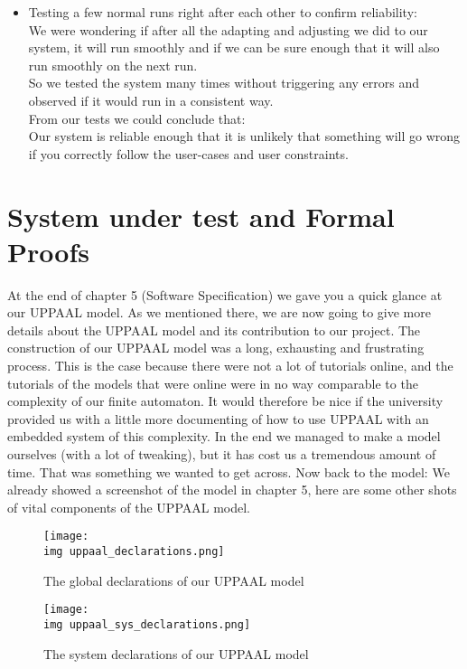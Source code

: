 \begin{itemize}
\item Testing a few normal runs right after each other to confirm reliability:\\
We were wondering if after all the adapting and adjusting we did to our system, it will run smoothly and if we can be sure enough that it will also run smoothly on the next run.\\
So we tested the system many times without triggering any errors and observed if it would run in a consistent way.\\
From our tests we could conclude that:\\
Our system is reliable enough that it is unlikely that something will go wrong if you correctly follow the user-cases and user constraints.\\

\end{itemize}

\newpage
\section{System under test and Formal Proofs}
At the end of chapter 5 (Software Specification) we gave you a quick glance at our UPPAAL model. As we mentioned there, we are now going to give more details about the UPPAAL model and its contribution to our project. The construction of our UPPAAL model was a long, exhausting and frustrating process. This is the case because there were not a lot of tutorials online, and the tutorials of the models that were online were in no way comparable to the complexity of our finite automaton. It would therefore be nice if the university provided us with a little more documenting of how to use UPPAAL with an embedded system of this complexity. In the end we managed to make a model ourselves (with a lot of tweaking), but it has cost us a tremendous amount of time. That was something we wanted to get across. Now back to the model: We already showed a screenshot of the model in chapter 5, here are some other shots of vital components of the UPPAAL model. \\

\begin{figure}[ht]
  \centering
  \texttt{[image: \\img uppaal\_declarations.png]}
  \caption{The global declarations of our UPPAAL model} 
  
  \vspace{0.3cm}

  \texttt{[image: \\img uppaal\_sys\_declarations.png]}
  \caption{The system declarations of our UPPAAL model}
\end{figure}

